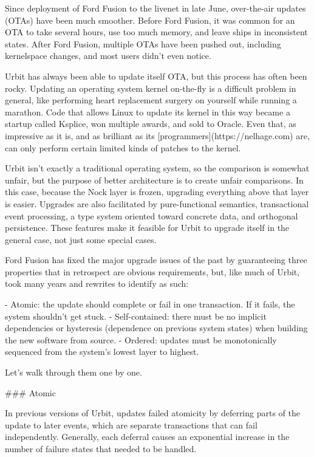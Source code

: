 \documentclass[twoside]{article}
\begin{document}
Since deployment of Ford Fusion to the livenet in late June, over-the-air updates (OTAs) have been much smoother. Before Ford Fusion, it was common for an OTA to take several hours, use too much memory, and leave ships in inconsistent states. After Ford Fusion, multiple OTAs have been pushed out, including kernelspace changes, and most users didn't even notice.

Urbit has always been able to update itself OTA, but this process has often been rocky. Updating an operating system kernel on-the-fly is a difficult problem in general, like performing heart replacement surgery on yourself while running a marathon. Code that allows Linux to update its kernel in this way became a startup called Ksplice, won multiple awards, and sold to Oracle. Even that, as impressive as it is, and as brilliant as its [programmers](https://nelhage.com) are, can only perform certain limited kinds of patches to the kernel.

Urbit isn't exactly a traditional operating system, so the comparison is somewhat unfair, but the purpose of better architecture is to create unfair comparisons. In this case, because the Nock layer is frozen, upgrading everything above that layer is easier. Upgrades are also facilitated by pure-functional semantics, transactional event processing, a type system oriented toward concrete data, and orthogonal persistence. These features make it feasible for Urbit to upgrade
itself in the general case, not just some special cases.

Ford Fusion has fixed the major upgrade issues of the past by guaranteeing three properties that in retrospect are obvious requirements, but, like much of Urbit, took many years and rewrites to identify as such:

- Atomic: the update should complete or fail in one transaction. If it
  fails, the system shouldn't get stuck.
- Self-contained: there must be no implicit dependencies or hysteresis
  (dependence on previous system states) when building the new software
  from source.
- Ordered: updates must be monotonically sequenced from the system's
  lowest layer to highest.

Let’s walk through them one by one.

### Atomic

In previous versions of Urbit, updates failed atomicity by deferring parts of the update to later events, which are separate transactions that can fail independently. Generally, each deferral causes an exponential increase in the number of failure states that needed to be handled.
\end{document}
